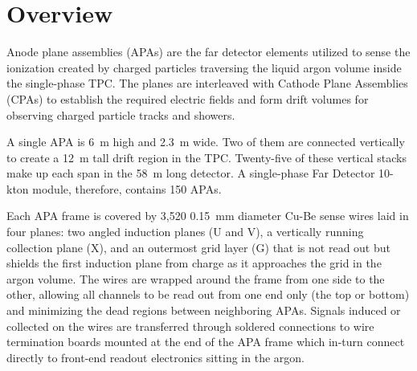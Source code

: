 \section{Overview}
\label{sec:fdsp-apa-intro}

Anode plane assemblies (APAs) are the far detector elements utilized to sense the ionization created by charged particles traversing the liquid argon volume inside the single-phase TPC.  The planes are interleaved with Cathode Plane Assemblies (CPAs) to establish the required electric fields and form drift volumes for observing charged particle tracks and showers. %

A single APA is \SI{6}{m} high and \SI{2.3}{m} wide.  Two of them are connected vertically to create a \SI{12}{m} tall drift region in the TPC.  %
Twenty-five of these vertical stacks make up each span in the 58~m long detector.  A single-phase Far Detector 10-kton module, therefore, contains 150 APAs.

Each APA frame is covered by 3,520 \SI{0.15}{mm} diameter Cu-Be sense wires laid in four planes: two angled induction planes (U and V), a vertically running collection plane (X), and an outermost grid layer (G) that is not read out but shields the first induction plane from charge as it approaches the grid in the argon volume.  The wires are wrapped around the frame from one side to the other, allowing all channels to be read out from one end only (the top or bottom) and minimizing the dead regions between neighboring APAs. 
Signals induced or collected on the wires are transferred through soldered connections to wire termination boards mounted at the end of the APA frame which in-turn connect directly to front-end readout electronics sitting in the argon. %

